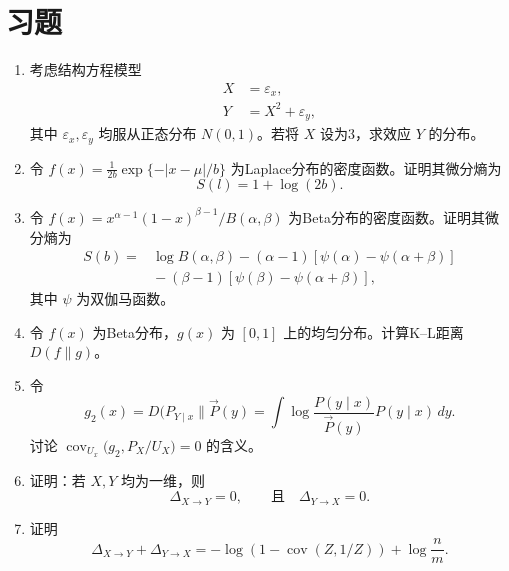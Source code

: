 \section*{习题}

\begin{enumerate}[label=\textbf{习题\arabic*.},leftmargin=5em]
\item 考虑结构方程模型
\[
\begin{aligned}
X&=\varepsilon_x,\\
Y&=X^2+\varepsilon_y,
\end{aligned}
\]
其中 $\varepsilon_x,\varepsilon_y$ 均服从正态分布 $N(0,1)$。若将 $X$ 设为3，求效应 $Y$ 的分布。

\item 令 $f(x)=\frac1{2b}\exp\{-|x-\mu|/b\}$ 为Laplace分布的密度函数。证明其微分熵为
\[
S(l)=1+\log(2b).
\]

\item 令 $f(x)=x^{\alpha-1}(1-x)^{\beta-1}/B(\alpha,\beta)$ 为Beta分布的密度函数。证明其微分熵为
\[
\begin{aligned}
S(b)={}&\log B(\alpha,\beta)-(\alpha-1)[\psi(\alpha)-\psi(\alpha+\beta)]\\
&{}-(\beta-1)[\psi(\beta)-\psi(\alpha+\beta)],
\end{aligned}
\]
其中 $\psi$ 为双伽马函数。

\item 令 $f(x)$ 为Beta分布，$g(x)$ 为 $[0,1]$ 上的均匀分布。计算K–L距离 $D(f\parallel g)$。

\item 令
\[
g_2(x)=D(P_{Y\mid x}\parallel\vec P(y)
 =\int\log\frac{P(y\mid x)}{\vec P(y)}P(y\mid x)\,dy.
\]
讨论 $\operatorname{cov}_{U_x}\bigl(g_2,P_X/U_X\bigr)=0$ 的含义。

\item 证明：若 $X,Y$ 均为一维，则
\[
\Delta_{X\to Y}=0,\qquad\text{且}\quad\Delta_{Y\to X}=0.
\]

\item 证明
\[
\Delta_{X\to Y}+\Delta_{Y\to X}
 =-\log(1-\operatorname{cov}(Z,1/Z))+\log\frac nm.
\]
\end{enumerate}
